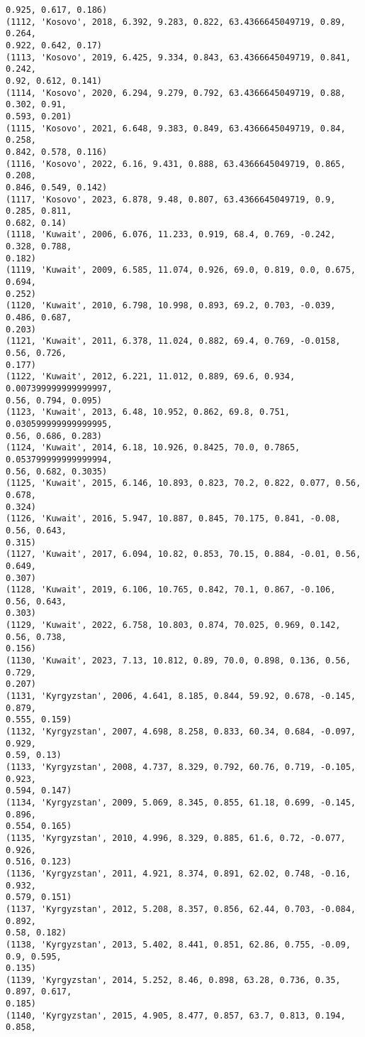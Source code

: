\documentclass[11pt]{article}
\begin{document}
\begin{Verbatim}[commandchars=\\\{\}]
0.925, 0.617, 0.186)
(1112, 'Kosovo', 2018, 6.392, 9.283, 0.822, 63.4366645049719, 0.89, 0.264,
0.922, 0.642, 0.17)
(1113, 'Kosovo', 2019, 6.425, 9.334, 0.843, 63.4366645049719, 0.841, 0.242,
0.92, 0.612, 0.141)
(1114, 'Kosovo', 2020, 6.294, 9.279, 0.792, 63.4366645049719, 0.88, 0.302, 0.91,
0.593, 0.201)
(1115, 'Kosovo', 2021, 6.648, 9.383, 0.849, 63.4366645049719, 0.84, 0.258,
0.842, 0.578, 0.116)
(1116, 'Kosovo', 2022, 6.16, 9.431, 0.888, 63.4366645049719, 0.865, 0.208,
0.846, 0.549, 0.142)
(1117, 'Kosovo', 2023, 6.878, 9.48, 0.807, 63.4366645049719, 0.9, 0.285, 0.811,
0.682, 0.14)
(1118, 'Kuwait', 2006, 6.076, 11.233, 0.919, 68.4, 0.769, -0.242, 0.328, 0.788,
0.182)
(1119, 'Kuwait', 2009, 6.585, 11.074, 0.926, 69.0, 0.819, 0.0, 0.675, 0.694,
0.252)
(1120, 'Kuwait', 2010, 6.798, 10.998, 0.893, 69.2, 0.703, -0.039, 0.486, 0.687,
0.203)
(1121, 'Kuwait', 2011, 6.378, 11.024, 0.882, 69.4, 0.769, -0.0158, 0.56, 0.726,
0.177)
(1122, 'Kuwait', 2012, 6.221, 11.012, 0.889, 69.6, 0.934, 0.007399999999999997,
0.56, 0.794, 0.095)
(1123, 'Kuwait', 2013, 6.48, 10.952, 0.862, 69.8, 0.751, 0.030599999999999995,
0.56, 0.686, 0.283)
(1124, 'Kuwait', 2014, 6.18, 10.926, 0.8425, 70.0, 0.7865, 0.053799999999999994,
0.56, 0.682, 0.3035)
(1125, 'Kuwait', 2015, 6.146, 10.893, 0.823, 70.2, 0.822, 0.077, 0.56, 0.678,
0.324)
(1126, 'Kuwait', 2016, 5.947, 10.887, 0.845, 70.175, 0.841, -0.08, 0.56, 0.643,
0.315)
(1127, 'Kuwait', 2017, 6.094, 10.82, 0.853, 70.15, 0.884, -0.01, 0.56, 0.649,
0.307)
(1128, 'Kuwait', 2019, 6.106, 10.765, 0.842, 70.1, 0.867, -0.106, 0.56, 0.643,
0.303)
(1129, 'Kuwait', 2022, 6.758, 10.803, 0.874, 70.025, 0.969, 0.142, 0.56, 0.738,
0.156)
(1130, 'Kuwait', 2023, 7.13, 10.812, 0.89, 70.0, 0.898, 0.136, 0.56, 0.729,
0.207)
(1131, 'Kyrgyzstan', 2006, 4.641, 8.185, 0.844, 59.92, 0.678, -0.145, 0.879,
0.555, 0.159)
(1132, 'Kyrgyzstan', 2007, 4.698, 8.258, 0.833, 60.34, 0.684, -0.097, 0.929,
0.59, 0.13)
(1133, 'Kyrgyzstan', 2008, 4.737, 8.329, 0.792, 60.76, 0.719, -0.105, 0.923,
0.594, 0.147)
(1134, 'Kyrgyzstan', 2009, 5.069, 8.345, 0.855, 61.18, 0.699, -0.145, 0.896,
0.554, 0.165)
(1135, 'Kyrgyzstan', 2010, 4.996, 8.329, 0.885, 61.6, 0.72, -0.077, 0.926,
0.516, 0.123)
(1136, 'Kyrgyzstan', 2011, 4.921, 8.374, 0.891, 62.02, 0.748, -0.16, 0.932,
0.579, 0.151)
(1137, 'Kyrgyzstan', 2012, 5.208, 8.357, 0.856, 62.44, 0.703, -0.084, 0.892,
0.58, 0.182)
(1138, 'Kyrgyzstan', 2013, 5.402, 8.441, 0.851, 62.86, 0.755, -0.09, 0.9, 0.595,
0.135)
(1139, 'Kyrgyzstan', 2014, 5.252, 8.46, 0.898, 63.28, 0.736, 0.35, 0.897, 0.617,
0.185)
(1140, 'Kyrgyzstan', 2015, 4.905, 8.477, 0.857, 63.7, 0.813, 0.194, 0.858,

\end{Verbatim}
\end{document}
